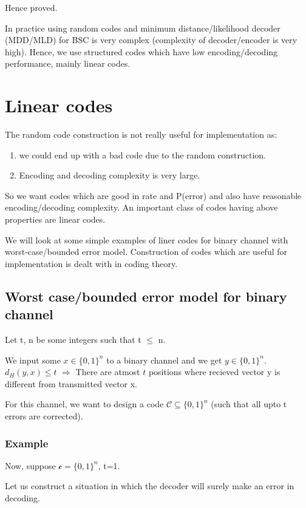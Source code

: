 \documentclass{article}
\begin{document}
Hence proved.


In practice using random codes and minimum distance/likelihood decoder (MDD/MLD) for BSC is very complex (complexity of decoder/encoder is very high). Hence, we use structured codes which have low encoding/decoding performance, mainly linear codes.

\section{Linear codes}
The random code construction is not really useful for implementation as:
\begin{enumerate}
    \item we could end up with a bad code due to the random construction.
    \item Encoding and decoding complexity is very large.
\end{enumerate}

So we want codes which are good in rate and P(error) and also have reasonable encoding/decoding complexity. An important class of codes having above properties are linear codes.

We will look at some simple examples of liner codes for binary channel with worst-case/bounded error model. Construction of codes which are useful for implementation is dealt with in coding theory.

\subsection{Worst case/bounded error model for binary channel}

Let t, n be some integers such that t $\leq $ n.

We input some $x \in \{ 0,1 \}^n$ to a binary channel and we get $y \in \{ 0,1\}^n$. $d_H(y,x)\leq t$ $\Rightarrow$ There are atmost $t$ positions where recieved vector y is different from transmitted vector x.

For this channel, we want to design a code $\mathscr{C} \subseteq \{ 0,1\}^n$ (such that all upto t errors are corrected).

\subsubsection{Example}


Now, suppose $\mathscr{c}= \{ 0,1 \}^n$, t=1.

Let us construct a situation in which the decoder will surely make an error in decoding.
\end{document}
